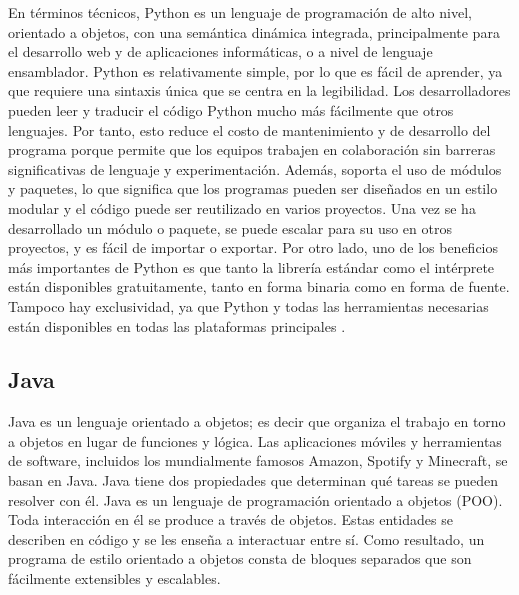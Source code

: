\begin{list}{}%
    {\setlength{\leftmargin}{1cm}\setlength{\rightmargin}{1cm}}
    \item\relax
    \small

En términos técnicos, Python es un lenguaje de programación de alto nivel, orientado a objetos, con una semántica dinámica integrada, principalmente para el desarrollo web y de aplicaciones informáticas, o a nivel de lenguaje ensamblador\cite{CitaD12}.
Python es relativamente simple, por lo que es fácil de aprender, ya que requiere una sintaxis única que se centra en la legibilidad. Los desarrolladores pueden leer y traducir el código Python mucho más fácilmente que otros lenguajes\cite{CitaD12}.
Por tanto, esto reduce el costo de mantenimiento y de desarrollo del programa porque permite que los equipos trabajen en colaboración sin barreras significativas de lenguaje y experimentación\cite{CitaD12}.
Además, soporta el uso de módulos y paquetes, lo que significa que los programas pueden ser diseñados en un estilo modular y el código puede ser reutilizado en varios proyectos. Una vez se ha desarrollado un módulo o paquete, se puede escalar para su uso en otros proyectos, y es fácil de importar o exportar\cite{CitaD12}.
Por otro lado, uno de los beneficios más importantes de Python es que tanto la librería estándar como el intérprete están disponibles gratuitamente, tanto en forma binaria como en forma de fuente\cite{CitaD12}.
Tampoco hay exclusividad, ya que Python y todas las herramientas necesarias están disponibles en todas las plataformas principales \cite{CitaD12}.

\end{list}


\subsection{Java}

\begin{list}{}%
    {\setlength{\leftmargin}{1cm}\setlength{\rightmargin}{1cm}}
    \item\relax
    \small

Java es un lenguaje orientado a objetos; es decir que organiza el trabajo en torno a objetos en lugar de funciones y lógica. Las aplicaciones móviles y herramientas de software, incluidos los mundialmente famosos Amazon, Spotify y Minecraft, se basan en Java.
Java tiene dos propiedades que determinan qué tareas se pueden resolver con él.
Java es un lenguaje de programación orientado a objetos (POO). Toda interacción en él se produce a través de objetos. Estas entidades se describen en código y se les enseña a interactuar entre sí. Como resultado, un programa de estilo orientado a objetos consta de bloques separados que son fácilmente extensibles y escalables. \cite{CitaD13}

\end{list}

